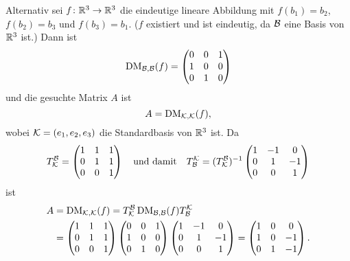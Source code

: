 \begin{solution}
 Alternativ sei $f \colon \mathbb{R}^3 \to \mathbb{R}^3$ die eindeutige lineare Abbildung mit $f(b_1) = b_2$, $f(b_2) = b_3$ und $f(b_3) = b_1$. ($f$ existiert und ist eindeutig, da $\mathcal{B}$ eine Basis von $\mathbb{R}^3$ ist.) Dann ist
 \[
  \operatorname{DM}_{\mathcal{B},\mathcal{B}}(f) =
  \begin{pmatrix}
   0 & 0 & 1 \\
   1 & 0 & 0 \\
   0 & 1 & 0
  \end{pmatrix}
 \]
 und die gesuchte Matrix $A$ ist
 \[
  A = \operatorname{DM}_{\mathcal{K},\mathcal{K}}(f),
 \]
 wobei $\mathcal{K} = (e_1, e_2, e_3)$ die Standardbasis von $\mathbb{R}^3$ ist. Da
 \[
  T^{\mathcal{B}}_{\mathcal{K}} =
  \begin{pmatrix}
   1 & 1 & 1 \\
   0 & 1 & 1 \\
   0 & 0 & 1
  \end{pmatrix}
  \quad\text{und damit}\quad
  T^{\mathcal{K}}_{\mathcal{B}} =
  (T^{\mathcal{B}}_{\mathcal{K}})^{-1}
  \begin{pmatrix}
   1 & -1 &  0 \\
   0 &  1 & -1 \\
   0 &  0 &  1
  \end{pmatrix}
 \]
 ist
 \begin{align*}
  A
  &= \operatorname{DM}_{\mathcal{K},\mathcal{K}}(f)
  = T^{\mathcal{B}}_{\mathcal{K}} \operatorname{DM}_{\mathcal{B},\mathcal{B}}(f) T^{\mathcal{K}}_{\mathcal{B}} \\
  &=
  \begin{pmatrix}
   1 & 1 & 1 \\
   0 & 1 & 1 \\
   0 & 0 & 1
  \end{pmatrix}
  \begin{pmatrix}
   0 & 0 & 1 \\
   1 & 0 & 0 \\
   0 & 1 & 0
  \end{pmatrix}
  \begin{pmatrix}
   1 & -1 &  0 \\
   0 &  1 & -1 \\
   0 &  0 &  1
  \end{pmatrix}
  =
  \begin{pmatrix}
   1 & 0 &  0 \\
   1 & 0 & -1 \\
   0 & 1 & -1
  \end{pmatrix}.
 \end{align*}
\end{solution}




